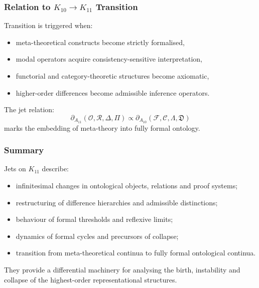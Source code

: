 \subsubsection{Relation to $K_{10} \to K_{11}$ Transition}

Transition is triggered when:
\begin{itemize}
    \item meta-theoretical constructs become strictly formalised,
    \item modal operators acquire consistency-sensitive interpretation,
    \item functorial and category-theoretic structures become axiomatic,
    \item higher-order differences become admissible inference operators.
\end{itemize}

The jet relation:
\[
\partial_{A_{11}}(\mathcal{O},\mathcal{R},\Delta,\Pi)
\propto
\partial_{A_{10}}(\mathcal{F},\mathcal{C},\Lambda,\mathfrak{D})
\]
marks the embedding of meta-theory into fully formal ontology.


\subsubsection{Summary}

Jets on $K_{11}$ describe:
\begin{itemize}
    \item infinitesimal changes in ontological objects, relations and
          proof systems;
    \item restructuring of difference hierarchies and admissible distinctions;
    \item behaviour of formal thresholds and reflexive limits;
    \item dynamics of formal cycles and precursors of collapse;
    \item transition from meta-theoretical continua to
          fully formal ontological continua.
\end{itemize}

They provide a differential machinery for analysing the birth,
instability and collapse of the highest-order representational structures.
